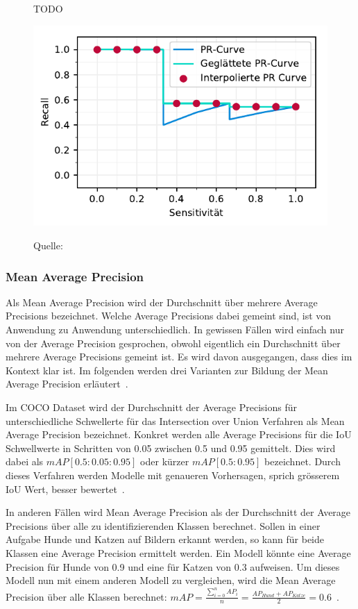 \begin{figure}[H]
    \captionsetup{width=.9\linewidth}
    \caption{TODO}
    \label{fig:pr-interpolated}
    \centering
    \includegraphics[scale=1]{graphics/matplot/ap__pr-interpolated.pdf}\\
    \caption*{Quelle: \textcite{AP}}
\end{figure}

\subsubsection{Mean Average Precision}
\label{chap:map}

Als Mean Average Precision wird der Durchschnitt über mehrere Average Precisions bezeichnet. Welche Average Precisions dabei gemeint sind, ist von Anwendung zu Anwendung unterschiedlich. In gewissen Fällen wird einfach nur von der Average Precision gesprochen, obwohl eigentlich ein Durchschnitt über mehrere Average Precisions gemeint ist. Es wird davon ausgegangen, dass dies im Kontext klar ist. Im folgenden werden drei Varianten zur Bildung der Mean Average Precision erläutert~\autocite{AP}.

Im COCO Dataset wird der Durchschnitt der Average Precisions für unterschiedliche Schwellerte für das Intersection over Union Verfahren als Mean Average Precision bezeichnet. Konkret werden alle Average Precisions für die IoU Schwellwerte in Schritten von 0.05 zwischen 0.5 und 0.95 gemittelt. Dies wird dabei als $mAP[0.5:0.05:0.95]$ oder kürzer $mAP[0.5:0.95]$ bezeichnet. Durch dieses Verfahren werden Modelle mit genaueren Vorhersagen, sprich grösserem IoU Wert, besser bewertet~\autocite{AP}.

In anderen Fällen wird Mean Average Precision als der Durchschnitt der Average Precisions über alle zu identifizierenden Klassen berechnet. Sollen in einer Aufgabe Hunde und Katzen auf Bildern erkannt werden, so kann für beide Klassen eine Average Precision ermittelt werden. Ein Modell könnte eine Average Precision für Hunde von 0.9 und eine für Katzen von 0.3 aufweisen. Um dieses Modell nun mit einem anderen Modell zu vergleichen, wird die Mean Average Precision über alle Klassen berechnet: $mAP = \frac{\sum_{i=0}^{n}AP_{i}}{n} = \frac{AP_{Hund}+AP_{Katze}}{2} = 0.6$~\autocite{AP}.

